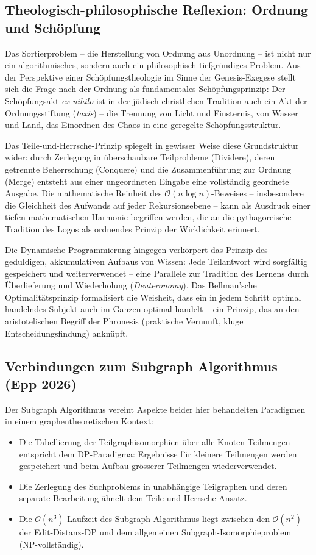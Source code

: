 ﻿\documentclass[a4paper,12pt]{article}
\theoremstyle{definition}
\begin{document}
\subsection{Theologisch-philosophische Reflexion: Ordnung und Schöpfung}

Das Sortierproblem -- die Herstellung von Ordnung aus Unordnung -- ist nicht nur
ein algorithmisches, sondern auch ein philosophisch tiefgründiges Problem.
Aus der Perspektive einer Schöpfungstheologie im Sinne der Genesis-Exegese
stellt sich die Frage nach der Ordnung als fundamentales Schöpfungsprinzip:
Der Schöpfungsakt \emph{ex nihilo} ist in der jüdisch-christlichen Tradition
auch ein Akt der Ordnungsstiftung (\emph{taxis}) -- die Trennung von Licht und
Finsternis, von Wasser und Land, das Einordnen des Chaos in eine geregelte
Schöpfungsstruktur.

Das Teile-und-Herrsche-Prinzip spiegelt in gewisser Weise diese Grundstruktur
wider: durch Zerlegung in überschaubare Teilprobleme (Dividere), deren
getrennte Beherrschung (Conquere) und die Zusammenführung zur Ordnung (Merge)
entsteht aus einer ungeordneten Eingabe eine vollständig geordnete Ausgabe.
Die mathematische Reinheit des $\mathcal{O}(n \log n)$-Beweises -- insbesondere
die Gleichheit des Aufwands auf jeder Rekursionsebene -- kann als Ausdruck
einer tiefen mathematischen Harmonie begriffen werden, die an die pythagoreische
Tradition des Logos als ordnendes Prinzip der Wirklichkeit erinnert.

Die Dynamische Programmierung hingegen verkörpert das Prinzip des geduldigen,
akkumulativen Aufbaus von Wissen: Jede Teilantwort wird sorgfältig gespeichert
und weiterverwendet -- eine Parallele zur Tradition des Lernens durch
Überlieferung und Wiederholung (\textit{Deuteronomy}). Das Bellman'sche
Optimalitätsprinzip formalisiert die Weisheit, dass ein in jedem Schritt optimal
handelndes Subjekt auch im Ganzen optimal handelt -- ein Prinzip, das an den
aristotelischen Begriff der Phronesis (praktische Vernunft, kluge Entscheidungsfindung)
anknüpft.

\subsection{Verbindungen zum Subgraph Algorithmus (Epp 2026)}

Der Subgraph Algorithmus \cite{epp2026subgraph} vereint Aspekte beider hier
behandelten Paradigmen in einem graphentheoretischen Kontext:
\begin{itemize}
    \item Die Tabellierung der Teilgraphisomorphien über alle Knoten-Teilmengen
          entspricht dem DP-Paradigma: Ergebnisse für kleinere Teilmengen
          werden gespeichert und beim Aufbau grösserer Teilmengen wiederverwendet.
    \item Die Zerlegung des Suchproblems in unabhängige Teilgraphen und deren
          separate Bearbeitung ähnelt dem Teile-und-Herrsche-Ansatz.
    \item Die $\mathcal{O}(n^3)$-Laufzeit des Subgraph Algorithmus liegt
          zwischen den $\mathcal{O}(n^2)$ der Edit-Distanz-DP und dem
          allgemeinen Subgraph-Isomorphieproblem (NP-vollständig).
\end{itemize}
\end{document}
